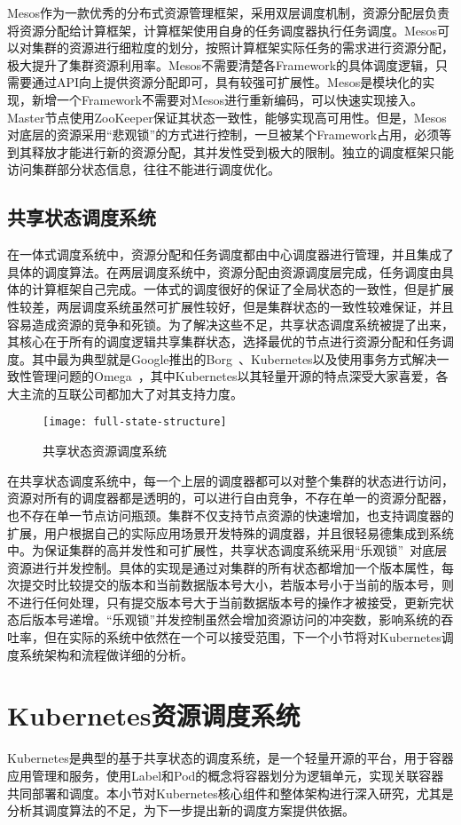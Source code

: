 Mesos作为一款优秀的分布式资源管理框架，采用双层调度机制，资源分配层负责将资源分配给计算框架，计算框架使用自身的任务调度器执行任务调度。Mesos可以对集群的资源进行细粒度的划分，按照计算框架实际任务的需求进行资源分配，极大提升了集群资源利用率。Mesos不需要清楚各Framework的具体调度逻辑，只需要通过API向上提供资源分配即可，具有较强可扩展性。Mesos是模块化的实现，新增一个Framework不需要对Mesos进行重新编码，可以快速实现接入。Master节点使用ZooKeeper保证其状态一致性，能够实现高可用性。但是，Mesos对底层的资源采用“悲观锁”的方式进行控制，一旦被某个Framework占用，必须等到其释放才能进行新的资源分配，其并发性受到极大的限制。独立的调度框架只能访问集群部分状态信息，往往不能进行调度优化。
\subsection{共享状态调度系统}
在一体式调度系统中，资源分配和任务调度都由中心调度器进行管理，并且集成了具体的调度算法。在两层调度系统中，资源分配由资源调度层完成，任务调度由具体的计算框架自己完成。一体式的调度很好的保证了全局状态的一致性，但是扩展性较差，两层调度系统虽然可扩展性较好，但是集群状态的一致性较难保证，并且容易造成资源的竞争和死锁。为了解决这些不足，共享状态调度系统被提了出来，其核心在于所有的调度逻辑共享集群状态，选择最优的节点进行资源分配和任务调度。其中最为典型就是Google推出的Borg~\cite{KUB2015}、Kubernetes以及使用事务方式解决一致性管理问题的Omega~\cite{Burns2016Borg}，其中Kubernetes以其轻量开源的特点深受大家喜爱，各大主流的互联公司都加大了对其支持力度。

\begin{figure}[H] %
	\centering
	\texttt{[image: full-state-structure]}
	\caption{共享状态资源调度系统}
\end{figure}
在共享状态调度系统中，每一个上层的调度器都可以对整个集群的状态进行访问，资源对所有的调度器都是透明的，可以进行自由竞争，不存在单一的资源分配器，也不存在单一节点访问瓶颈。集群不仅支持节点资源的快速增加，也支持调度器的扩展，用户根据自己的实际应用场景开发特殊的调度器，并且很轻易德集成到系统中。为保证集群的高并发性和可扩展性，共享状态调度系统采用“乐观锁”~\cite{Halici1991An}对底层资源进行并发控制。具体的实现是通过对集群的所有状态都增加一个版本属性，每次提交时比较提交的版本和当前数据版本号大小，若版本号小于当前的版本号，则不进行任何处理，只有提交版本号大于当前数据版本号的操作才被接受，更新完状态后版本号递增。“乐观锁”并发控制虽然会增加资源访问的冲突数，影响系统的吞吐率，但在实际的系统中依然在一个可以接受范围，下一个小节将对Kubernetes调度系统架构和流程做详细的分析。

\section{Kubernetes资源调度系统}
Kubernetes是典型的基于共享状态的调度系统，是一个轻量开源的平台，用于容器应用管理和服务，使用Label和Pod的概念将容器划分为逻辑单元，实现关联容器共同部署和调度。本小节对Kubernetes核心组件和整体架构进行深入研究，尤其是分析其调度算法的不足，为下一步提出新的调度方案提供依据。
